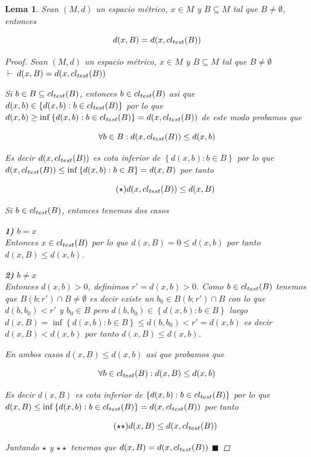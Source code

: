 \documentclass[oneside]{book} %
\theoremstyle{Teorema}
\newtheorem{Lema}[Definicion]{Lema}
\theoremstyle{Ejemplos}
\theoremstyle{[Obs]}
\def \test {test}
\newcommand{\cerradura}[2][\test]{\ifx \test #1 {\overline{#2}} \else {cl_{#1}(#2)} \fi} %
\renewcommand{\{}{\left\lbrace} %
\renewcommand{\}}{\right\rbrace} %
\newcommand{\n}{\cap} %
\renewcommand{\sc}{\subseteq} %
\renewcommand{\qed}{$\blacksquare$} %
\newcommand{\pd}{$\vdash\ $} %
\begin{document}
			\begin{Lema}\setlength{\parindent}{0em}
			
				Sean $(M, d)$ un espacio métrico, $x \in M$ y $B \sc M$ tal que $B \neq \emptyset$, entonces 

				\[ d(x, B) = d(x, \cerradura{B}) \]

				\begin{proof}
					
					Sean $(M, d)$ un espacio métrico, $x \in M$ y $B \sc M$ tal que $B \neq \emptyset$ \\ 
					\pd $d(x, B) = d(x, \cerradura{B})$

					Si $b \in B \sc \cerradura{B}$, entonces $b \in \cerradura{B}$ asi que $d(x, b) \in \{ d(x, b) : b \in \cerradura{B} \}$ por lo que $d(x, b) \geq \inf\{ d(x, b) : b \in \cerradura{B} \} = d(x, \cerradura{B})$ de este modo probamos que 
					
					\[ \forall b \in B : d(x, \cerradura{B}) \leq d(x, b) \]

					Es decir $d(x, \cerradura{B})$ es cota inferior de $\{ d(x, b) : b \in B \}$ por lo que $d(x, \cerradura{B}) \leq \inf\{ d(x, b) : b \in B \} = d(x, B)$ por tanto 

					\begin{equation*}\tag{$\star$}
						d(x, \cerradura{B}) \leq d(x, B)
					\end{equation*}

					Si $b \in \cerradura{B}$, entonces tenemos dos casos 

					\textbf{1)} $b = x$ \\ 
					Entonces $x \in \cerradura{B}$ por lo que $d(x, B) = 0 \leq d(x, b)$ por tanto $d(x, B) \leq d(x, b)$.

					\textbf{2)} $b \neq x$ \\ 
					Entonces $d(x, b) > 0$, definimos $r' = d(x, b) > 0$. Como $b \in \cerradura{B}$ tenemos que $B(b;r') \n B \neq \emptyset$ es decir existe un $b_0 \in B(b;r') \n B$ con lo que $d(b, b_0) < r'$ y $b_0 \in B$ pero $d(b, b_0) \in \{ d(x, b) : b \in B \}$ luego $d(x, B) = \inf\{ d(x, b) : b \in B \} \leq d(b, b_0) < r' = d(x, b)$ es decir $d(x, B) < d(x, b)$ por tanto $d(x, B) \leq d(x, b)$.

					En ambos casos $d(x, B) \leq d(x, b)$ asi que probamos que 

					\[ \forall b \in \cerradura{B} : d(x, B) \leq d(x, b) \]

					Es decir $d(x, B)$ es cota inferior de $\{ d(x, b) : b \in \cerradura{B} \}$ por lo que $d(x, B) \leq \inf\{ d(x, b) : b \in \cerradura{B} \} = d(x, \cerradura{B})$ por tanto 

					\begin{equation*}\tag{$\star\star$}
						d(x, B) \leq d(x, \cerradura{B})
					\end{equation*}

					Juntando $\star$ y $\star\star$ tenemos que $d(x, B) = d(x, \cerradura{B})$ \qed

				\end{proof}
			
			\end{Lema}
\end{document}
